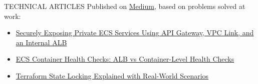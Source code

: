 \documentclass{resume} %
\begin{document}

%
%
%


\begin{rSection}{TECHNICAL ARTICLES}
Published on \href{https://medium.com/@mukkuchandrasekharreddy2001}{Medium}, based on problems solved at work:
\begin{itemize}
    \itemsep -3pt {}
    \item \href{https://medium.com/@mukkuchandrasekharreddy2001/securely-exposing-private-ecs-services-using-api-gateway-vpc-link-and-an-internal-alb-865fe9fcf3e6}{Securely Exposing Private ECS Services Using API Gateway, VPC Link, and an Internal ALB}
    \item \href{https://medium.com/@mukkuchandrasekharreddy2001/ecs-container-health-checks-alb-vs-container-level-health-checks-de90a80c1f84}{ECS Container Health Checks: ALB vs Container-Level Health Checks}
    \item \href{https://medium.com/@mukkuchandrasekharreddy2001/terraform-state-locking-explained-with-real-world-scenarios-from-dynamodb-to-lockfiles-and-force-99d3814d8c8b}{Terraform State Locking Explained with Real-World Scenarios}
\end{itemize}
\end{rSection}
\end{document}
